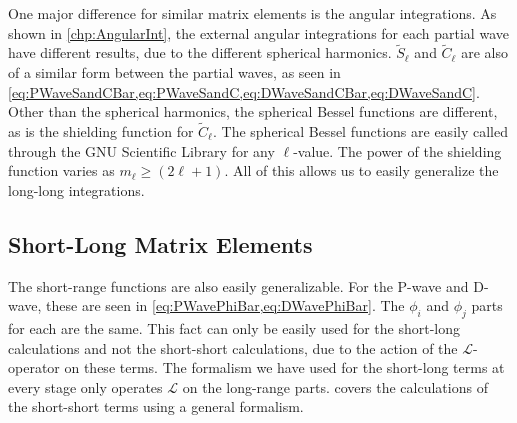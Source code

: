 \documentclass[Dissertation.tex]{subfiles}
\begin{document}
One major difference for similar matrix elements is the angular integrations. 
As shown in \cref{chp:AngularInt}, the external angular integrations 
for each partial wave have different results, due to the different spherical 
harmonics. $\widetilde{S}_\ell$ and $\widetilde{C}_\ell$ are also of a similar form between the 
partial waves, as seen in \cref{eq:PWaveSandCBar,eq:PWaveSandC,eq:DWaveSandCBar,eq:DWaveSandC}.
Other than the spherical harmonics, the spherical Bessel functions are 
different, as is the shielding function for $\widetilde{C}_\ell$. The spherical Bessel 
functions are easily called through the GNU Scientific Library \cite{GSL} for 
any $\ell$-value. The power of the shielding function varies as
$m_\ell \geq (2\ell + 1)$. All of this allows us to easily generalize the long-long 
integrations.



\subsection{Short-Long Matrix Elements}
\label{sec:GeneralShortLong}
The short-range functions are also easily generalizable. For the P-wave and
D-wave, these are seen in \cref{eq:PWavePhiBar,eq:DWavePhiBar}. The $\phi_i$
and $\phi_j$ parts for each are the same. This fact can only 
be easily used for the short-long calculations and not the short-short 
calculations, due to the action of the $\mathcal{L}$-operator on these terms. The 
formalism we have used for the short-long terms at every stage only operates
$\mathcal{L}$ on the long-range parts.  covers 
the calculations of the short-short terms using a general formalism.
\end{document}
